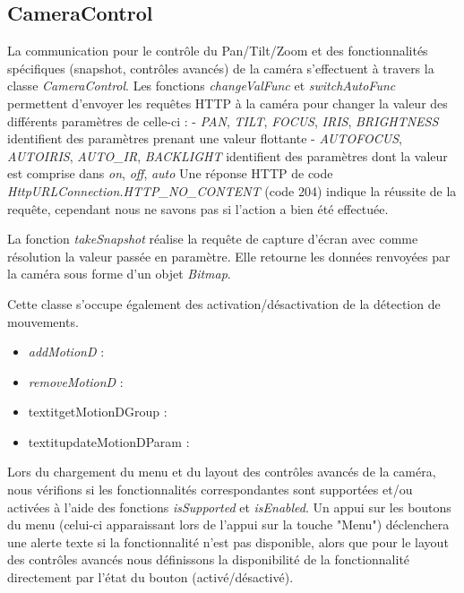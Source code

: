 \subsection{CameraControl}
La communication pour le contrôle du Pan/Tilt/Zoom et des fonctionnalités spécifiques (snapshot, contrôles avancés) de la caméra s'effectuent à travers la classe \textit{CameraControl}.
Les fonctions \textit{changeValFunc} et \textit{switchAutoFunc} permettent d'envoyer les requêtes HTTP à la caméra pour changer la valeur des différents paramètres de celle-ci :
- \textit{PAN}, \textit{TILT}, \textit{FOCUS}, \textit{IRIS}, \textit{BRIGHTNESS} identifient des paramètres prenant une valeur flottante
- \textit{AUTOFOCUS}, \textit{AUTOIRIS}, \textit{AUTO\_IR}, \textit{BACKLIGHT}
identifient des paramètres dont la valeur est comprise dans { \textit{on}, \textit{off}, \textit{auto} } Une réponse HTTP de code \textit{HttpURLConnection.HTTP\_NO\_CONTENT} (code 204)
indique la réussite de la requête, cependant nous ne savons pas si l'action a bien été effectuée.

La fonction \textit{takeSnapshot} réalise la requête de capture d'écran avec comme résolution la valeur passée en paramètre.
Elle retourne les données renvoyées par la caméra sous forme d'un objet \textit{Bitmap}.

Cette classe s'occupe également des activation/désactivation de la détection de mouvements.
\begin{itemize}
	\item \textit{addMotionD} : 
	\item \textit{removeMotionD} : 
	\item textit{getMotionDGroup} : 
	\item textit{updateMotionDParam} : 
\end{itemize}

Lors du chargement du menu et du layout des contrôles avancés de la caméra, nous vérifions si les fonctionnalités correspondantes sont supportées et/ou activées à l'aide des fonctions
\textit{isSupported} et \textit{isEnabled}. Un appui sur les boutons du menu (celui-ci apparaissant lors de l'appui sur la touche "Menu") déclenchera une alerte texte si la fonctionnalité n'est pas
disponible, alors que pour le layout des contrôles avancés nous définissons la disponibilité de la fonctionnalité directement par l'état du bouton (activé/désactivé).

